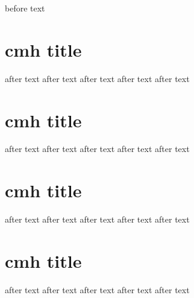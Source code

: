 before text

\section{cmh title}
	
	after text
	after text
	after text
	after text
	after text
\section{cmh title}
	
	after text
	after text
	after text
	after text
	after text
\section{cmh title}
	
	after text
	after text
	after text
	after text
	after text
\section{cmh title}
	
	after text
	after text
	after text
	after text
	after text
